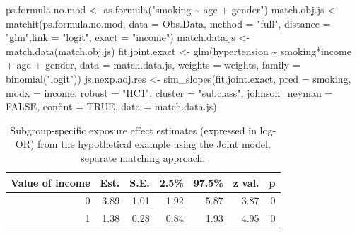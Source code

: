 \documentclass[
  letterpaper,
  DIV=11,
  numbers=noendperiod]{scrreprt}
\newenvironment{Shaded}{\begin{snugshade}}{\end{snugshade}}
\newcommand{\AttributeTok}[1]{\textcolor[rgb]{0.40,0.45,0.13}{#1}}
\newcommand{\ConstantTok}[1]{\textcolor[rgb]{0.56,0.35,0.01}{#1}}
\newcommand{\FunctionTok}[1]{\textcolor[rgb]{0.28,0.35,0.67}{#1}}
\newcommand{\NormalTok}[1]{\textcolor[rgb]{0.00,0.23,0.31}{#1}}
\newcommand{\OtherTok}[1]{\textcolor[rgb]{0.00,0.23,0.31}{#1}}
\newcommand{\SpecialCharTok}[1]{\textcolor[rgb]{0.37,0.37,0.37}{#1}}
\newcommand{\StringTok}[1]{\textcolor[rgb]{0.13,0.47,0.30}{#1}}
\begin{document}
\begin{Shaded}
\begin{Highlighting}[]
\NormalTok{ps.formula.no.mod }\OtherTok{\textless{}{-}} \FunctionTok{as.formula}\NormalTok{(}\StringTok{"smoking \textasciitilde{} age + gender"}\NormalTok{)}
\NormalTok{match.obj.js }\OtherTok{\textless{}{-}} \FunctionTok{matchit}\NormalTok{(ps.formula.no.mod, }\AttributeTok{data =}\NormalTok{ Obs.Data,}
                        \AttributeTok{method =} \StringTok{"full"}\NormalTok{, }\AttributeTok{distance =} \StringTok{"glm"}\NormalTok{,}\AttributeTok{link =} \StringTok{"logit"}\NormalTok{,}
                        \AttributeTok{exact =} \StringTok{"income"}\NormalTok{)}
\NormalTok{match.data.js }\OtherTok{\textless{}{-}} \FunctionTok{match.data}\NormalTok{(match.obj.js)}
\NormalTok{fit.joint.exact }\OtherTok{\textless{}{-}} \FunctionTok{glm}\NormalTok{(hypertension }\SpecialCharTok{\textasciitilde{}}\NormalTok{ smoking}\SpecialCharTok{*}\NormalTok{income }\SpecialCharTok{+}\NormalTok{ age }\SpecialCharTok{+}\NormalTok{ gender, }
                       \AttributeTok{data =}\NormalTok{ match.data.js, }\AttributeTok{weights =}\NormalTok{ weights,}
                       \AttributeTok{family =} \FunctionTok{binomial}\NormalTok{(}\StringTok{"logit"}\NormalTok{))}
\NormalTok{js.nexp.adj.res }\OtherTok{\textless{}{-}} \FunctionTok{sim\_slopes}\NormalTok{(fit.joint.exact, }
                              \AttributeTok{pred =}\NormalTok{ smoking, }\AttributeTok{modx =}\NormalTok{ income,}
                              \AttributeTok{robust =} \StringTok{"HC1"}\NormalTok{, }\AttributeTok{cluster =} \StringTok{"subclass"}\NormalTok{,}
                              \AttributeTok{johnson\_neyman =} \ConstantTok{FALSE}\NormalTok{, }\AttributeTok{confint =} \ConstantTok{TRUE}\NormalTok{,}
                              \AttributeTok{data =}\NormalTok{ match.data.js)}
\end{Highlighting}
\end{Shaded}

\hypertarget{tbl-joint-approach-sep}{}
\begin{table}[!h]
\caption{\label{tbl-joint-approach-sep}Subgroup-specific exposure effect estimates (expressed in log-OR) from
the hypothetical example using the Joint model, separate matching
approach. }\tabularnewline

\centering
\begin{tabular}{rrrrrrr}
\toprule
Value of income & Est. & S.E. & 2.5\% & 97.5\% & z val. & p\\
\midrule
0 & 3.89 & 1.01 & 1.92 & 5.87 & 3.87 & 0\\
1 & 1.38 & 0.28 & 0.84 & 1.93 & 4.95 & 0\\
\bottomrule
\end{tabular}
\end{table}
\end{document}
